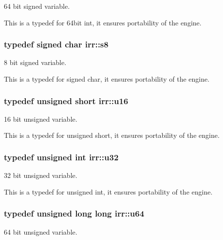 64 bit signed variable. 

This is a typedef for 64bit int, it ensures portability of the engine. 
\subsubsection[{\texorpdfstring{s8}{s8}}]{\setlength{\rightskip}{0pt plus 5cm}typedef signed char {\bf irr\+::s8}}\hypertarget{namespaceirr_adc3ec66d7537550be0fea1c9eeadd63d}{}\label{namespaceirr_adc3ec66d7537550be0fea1c9eeadd63d}


8 bit signed variable. 

This is a typedef for signed char, it ensures portability of the engine. 
\subsubsection[{\texorpdfstring{u16}{u16}}]{\setlength{\rightskip}{0pt plus 5cm}typedef unsigned short {\bf irr\+::u16}}\hypertarget{namespaceirr_ae9f8ec82692ad3b83c21f555bfa70bcc}{}\label{namespaceirr_ae9f8ec82692ad3b83c21f555bfa70bcc}


16 bit unsigned variable. 

This is a typedef for unsigned short, it ensures portability of the engine. 
\subsubsection[{\texorpdfstring{u32}{u32}}]{\setlength{\rightskip}{0pt plus 5cm}typedef unsigned int {\bf irr\+::u32}}\hypertarget{namespaceirr_a0416a53257075833e7002efd0a18e804}{}\label{namespaceirr_a0416a53257075833e7002efd0a18e804}


32 bit unsigned variable. 

This is a typedef for unsigned int, it ensures portability of the engine. 
\subsubsection[{\texorpdfstring{u64}{u64}}]{\setlength{\rightskip}{0pt plus 5cm}typedef unsigned long long {\bf irr\+::u64}}\hypertarget{namespaceirr_a9701cac11d289143453e212684075af7}{}\label{namespaceirr_a9701cac11d289143453e212684075af7}


64 bit unsigned variable. 

